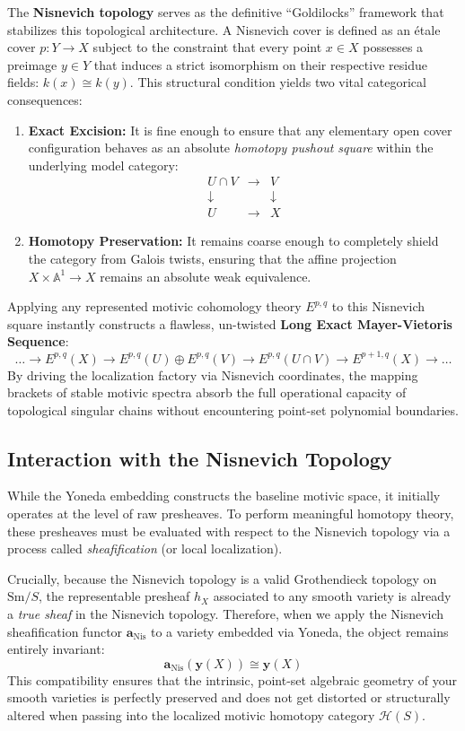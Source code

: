 \documentclass[11pt,oneside]{article}
\begin{document}
The \textbf{Nisnevich topology} serves as the definitive ``Goldilocks'' framework that stabilizes this topological architecture. A Nisnevich cover is defined as an \'etale cover $p: Y \to X$ subject to the constraint that every point $x \in X$ possesses a preimage $y \in Y$ that induces a strict isomorphism on their respective residue fields: $k(x) \cong k(y)$. This structural condition yields two vital categorical consequences:
\begin{enumerate}
    \item \textbf{Exact Excision:} It is fine enough to ensure that any elementary open cover configuration behaves as an absolute \emph{homotopy pushout square} within the underlying model category:
    \[ \begin{array}{ccc} U \cap V & \longrightarrow & V \\ \downarrow & & \downarrow \\ U & \longrightarrow & X \end{array} \]
    \item \textbf{Homotopy Preservation:} It remains coarse enough to completely shield the category from Galois twists, ensuring that the affine projection $X \times \mathbb{A}^1 \to X$ remains an absolute weak equivalence.
\end{enumerate}
Applying any represented motivic cohomology theory $E^{p,q}$ to this Nisnevich square instantly constructs a flawless, un-twisted \textbf{Long Exact Mayer-Vietoris Sequence}:
\[ \dots \longrightarrow E^{p,q}(X) \longrightarrow E^{p,q}(U) \oplus E^{p,q}(V) \longrightarrow E^{p,q}(U \cap V) \longrightarrow E^{p+1,q}(X) \longrightarrow \dots \]
By driving the localization factory via Nisnevich coordinates, the mapping brackets of stable motivic spectra absorb the full operational capacity of topological singular chains without encountering point-set polynomial boundaries.
\subsection*{Interaction with the Nisnevich Topology}
While the Yoneda embedding constructs the baseline motivic space, it initially operates at the level of raw presheaves. To perform meaningful homotopy theory, these presheaves must be evaluated with respect to the Nisnevich topology via a process called \emph{sheafification} (or local localization).

Crucially, because the Nisnevich topology is a valid Grothendieck topology on $\text{Sm}/S$, the representable presheaf $h_X$ associated to any smooth variety is already a \emph{true sheaf} in the Nisnevich topology. Therefore, when we apply the Nisnevich sheafification functor $\mathbf{a}_{\text{Nis}}$ to a variety embedded via Yoneda, the object remains entirely invariant:
\[ \mathbf{a}_{\text{Nis}}(\mathbf{y}(X)) \cong \mathbf{y}(X) \]
This compatibility ensures that the intrinsic, point-set algebraic geometry of your smooth varieties is perfectly preserved and does not get distorted or structurally altered when passing into the localized motivic homotopy category $\mathcal{H}(S)$.
\end{document}
